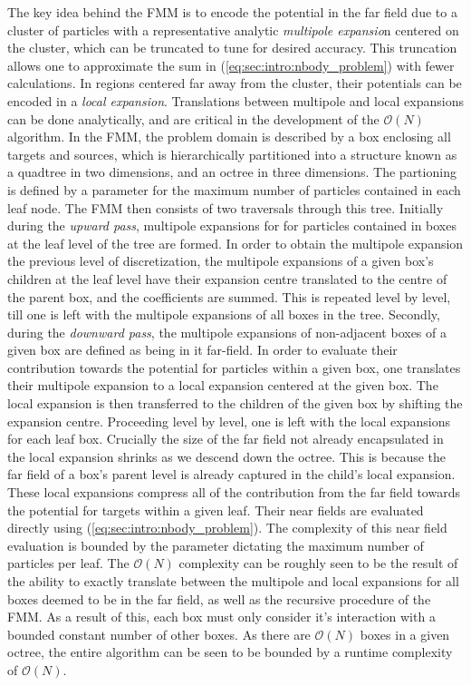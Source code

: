 \documentclass{IEEEcsmag}
\begin{document}
The key idea behind the FMM is to encode the potential in the far field due to a cluster of particles with a representative analytic \textit{multipole expansio}n centered on the cluster, which can be truncated to tune for desired accuracy. This truncation allows one to approximate the sum in (\ref{eq:sec:intro:nbody_problem}) with fewer calculations. In regions centered far away from the cluster, their potentials can be encoded in a \textit{local expansion}. Translations between multipole and local expansions can be done analytically, and are critical in the development of the $\mathcal{O}(N)$ algorithm. In the FMM, the problem domain is described by a box enclosing all targets and sources, which is hierarchically partitioned into a structure known as a quadtree in two dimensions, and an octree in three dimensions. The partioning is defined by a parameter for the maximum number of particles contained in each leaf node. The FMM then consists of two traversals through this tree. Initially during the \textit{upward pass}, multipole expansions for for particles contained in boxes at the leaf level of the tree are formed. In order to obtain the multipole expansion the previous level of discretization, the multipole expansions of a given box's children at the leaf level have their expansion centre translated to the centre of the parent box, and the coefficients are summed. This is repeated level by level, till one is left with the multipole expansions of all boxes in the tree. Secondly, during the \textit{downward pass}, the multipole expansions of non-adjacent boxes of a given box are defined as being in it far-field. In order to evaluate their contribution towards the potential for particles within a given box, one translates their multipole expansion to a local expansion centered at the given box. The local expansion is then transferred to the children of the given box by shifting the expansion centre. Proceeding level by level, one is left with the local expansions for each leaf box. Crucially the size of the far field not already encapsulated in the local expansion shrinks as we descend down the octree. This is because the far field of a box's parent level is already captured in the child's local expansion. These local expansions compress all of the contribution from the far field towards the potential for targets within a given leaf. Their near fields are evaluated directly using (\ref{eq:sec:intro:nbody_problem}). The complexity of this near field evaluation is bounded by the parameter dictating the maximum number of particles per leaf. The $\mathcal{O}(N)$ complexity can be roughly seen to be the result of the ability to exactly translate between the multipole and local expansions for all boxes deemed to be in the far field, as well as the recursive procedure of the FMM. As a result of this, each box must only consider it's interaction with a bounded constant number of other boxes. As there are $\mathcal{O}(N)$ boxes in a given octree, the entire algorithm can be seen to be bounded by a runtime complexity of $\mathcal{O}(N)$.
\end{document}
